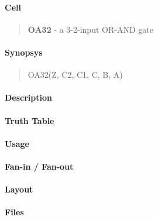 \label{OA32}
\paragraph{Cell}
\begin{quote}
    \textbf{OA32} - a 3-2-input OR-AND gate
\end{quote}

\paragraph{Synopsys}
\begin{quote}
    OA32(Z, C2, C1, C, B, A)
\end{quote}

\paragraph{Description}

%

\paragraph{Truth Table}
%

\paragraph{Usage}

\paragraph{Fan-in / Fan-out}

\paragraph{Layout}

\paragraph{Files}

